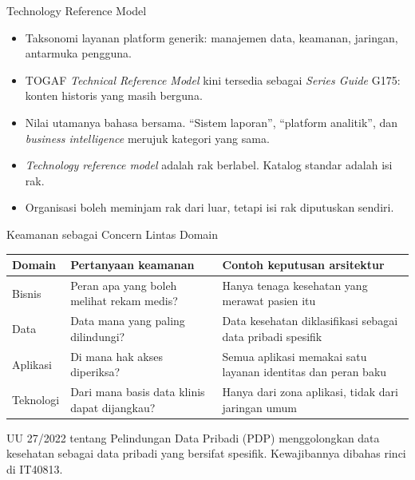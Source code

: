 \documentclass[aspectratio=169, table, 12pt]{beamer}
\begin{document}
\begin{frame}{{\Large Technology Reference Model}}
  \small
  \vspace{6pt}
  \begin{itemize}
    \item Taksonomi layanan platform generik: manajemen data, keamanan, jaringan, antarmuka pengguna.
    \item TOGAF \textit{Technical Reference Model} kini tersedia sebagai \textit{Series Guide} G175:
          konten historis yang masih berguna.
    \item Nilai utamanya bahasa bersama. ``Sistem laporan'', ``platform analitik'', dan
          \textit{business intelligence} merujuk kategori yang sama.
    \item \textit{Technology reference model} adalah rak berlabel. Katalog standar adalah isi rak.
    \item Organisasi boleh meminjam rak dari luar, tetapi isi rak diputuskan sendiri.
  \end{itemize}
\end{frame}

\begin{frame}{{\Large Keamanan sebagai Concern Lintas Domain}}
  \footnotesize
  \begin{tabularx}{\textwidth}{L{1.7cm}YY}
    \hline
    \textbf{Domain} & \textbf{Pertanyaan keamanan} & \textbf{Contoh keputusan arsitektur} \\
    \hline
    Bisnis & Peran apa yang boleh melihat rekam medis? & Hanya tenaga kesehatan yang merawat pasien itu \\
    \hline
    Data & Data mana yang paling dilindungi? & Data kesehatan diklasifikasi sebagai data pribadi spesifik \\
    \hline
    Aplikasi & Di mana hak akses diperiksa? & Semua aplikasi memakai satu layanan identitas dan peran baku \\
    \hline
    Teknologi & Dari mana basis data klinis dapat dijangkau? & Hanya dari zona aplikasi, tidak dari jaringan umum \\
    \hline
  \end{tabularx}

  \vspace{6pt}
  \small UU 27/2022 tentang Pelindungan Data Pribadi (PDP) menggolongkan data kesehatan sebagai data
  pribadi yang bersifat spesifik. Kewajibannya dibahas rinci di IT40813.
\end{frame}
\end{document}
